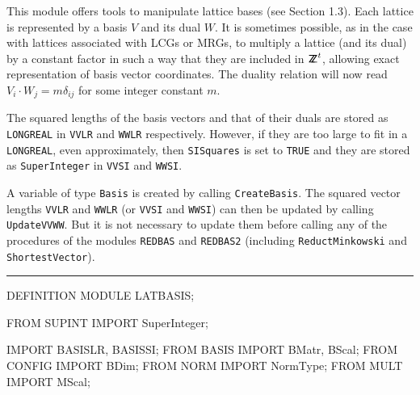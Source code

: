 
This module offers tools to manipulate lattice bases
(see Section 1.3).
Each lattice is represented by a basis $V$ and its dual $W$.
It is sometimes possible, as in the case with lattices associated with
LCGs or MRGs, to multiply a lattice (and its dual) by a constant factor
in such a way that they are included in ${\sf Z\kern-0.4em Z}^t$, allowing exact representation
of basis vector coordinates.
The duality relation will now read $V_i\cdot W_j = m\delta_{ij}$
for some integer constant {$m$}.

%

The squared lengths of the basis vectors and that of their duals
are stored as {\tt LONGREAL} in {\tt VVLR} and {\tt WWLR} respectively.
However, if they are too large to fit in a {\tt LONGREAL},
even approximately, then {\tt SISquares} is set to {\tt TRUE} and
they are stored as {\tt SuperInteger} in {\tt VVSI} and {\tt WWSI}.  

A variable of type {\tt Basis} is created by calling {\tt CreateBasis}.
The squared vector lengths {\tt VVLR} and {\tt WWLR} 
(or {\tt VVSI} and {\tt WWSI})
can then be updated by calling {\tt UpdateVVWW}.
But it is not necessary to update them before calling any of the procedures
of the modules {\tt REDBAS} and {\tt REDBAS2}
(including {\tt ReductMinkowski} and {\tt ShortestVector}).

\bigskip\hrule
\code

DEFINITION MODULE LATBASIS;

FROM SUPINT  IMPORT SuperInteger;

IMPORT BASISLR, BASISSI;
FROM BASIS    IMPORT BMatr, BScal;
FROM CONFIG   IMPORT BDim;
FROM NORM     IMPORT NormType;
FROM MULT     IMPORT MScal;

